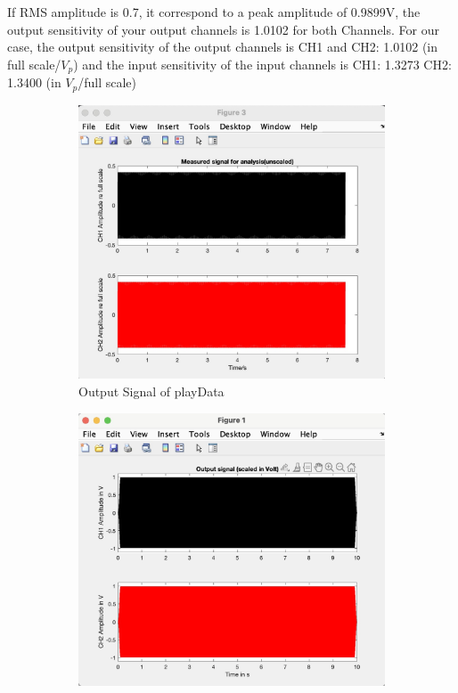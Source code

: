 \documentclass[
	a4paper,
	11pt,
]{article}
\begin{document}
If RMS amplitude is 0.7, it correspond to a peak amplitude of 0.9899V, the output sensitivity of your output channels is 1.0102 for both Channels. For our case, the output sensitivity of the output channels is CH1 and CH2: 1.0102 (in full scale/$V_p$) and the input sensitivity of the input channels is CH1: 1.3273  CH2: 1.3400 (in $V_p$/full scale)\\
\begin{figure}[htb!]
    \centering
        \begin{subfigure}[b]{0.45\textwidth}
        \centering
        \includegraphics[width=\textwidth]{2_img/2(a)_1.jpg}
        \caption[Output Signal of playData]%
        {{\small  Output Signal of playData }}    
        \label{fig:mean and std of net14}
    \end{subfigure}
    \hfill
    \centering
        \begin{subfigure}[b]{0.45\textwidth}
        \centering
        \includegraphics[width=\textwidth]{2_img/2(a)_2.jpg}

\end{subfigure}
\end{figure}
\end{document}
